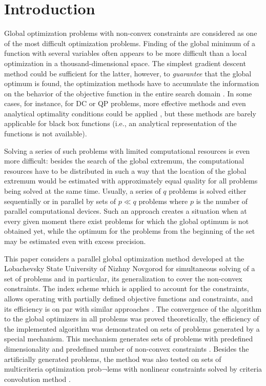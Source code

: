 \documentclass[runningheads]{llncs}
\begin{document}
\section{Introduction}
\label{sec-intro}
Global optimization problems with non-convex constraints are considered as one of the most difficult
optimization problems.
Finding of the global minimum of a function with several variables often appears to be
more difficult than a local optimization in a thousand-dimensional space.
The simplest gradient descent method could be sufficient for the latter, however,
to \textit{guarantee} that the global optimum is found, the optimization
methods have to accumulate the information on the behavior of the objective function
in the entire search domain  \cite{Jones2009,Paulavicius2011,Evtushenko2013,Strongin2000}.
In some cases, for instance, for DC or QP problems, more effective methods and even
analytical optimality conditions could be applied  \cite{PhamDinh2014, qpBook},
but these methods are barely applicable for black box functions (i.e., an analytical
representation of the functions is not available).

Solving a series of such problems with limited computational resources is even more
difficult: besides the search of the global extremum, the computational resources
have to be distributed in such a way that the location of the global extremum would be
estimated with approximately equal quality for all problems being solved at the same time.
Usually, a series of  \(q\) problems is solved either sequentially or in parallel by sets of  \(p\ll
q\) problems where \(p\) is the number of parallel computational devices.
Such an approach creates a situation when at every given moment there exist problems for which
the global optimum is not obtained yet, while the optimum for the problems from the beginning of
the set may be estimated even with excess precision.

This paper considers a parallel global optimization method developed at the Lobachevsky
State University of Nizhny Novgorod for simultaneous solving of a set of problems \cite{BarkalovStrongin2018}
and in particular, its generalization to cover the non-convex constraints. The index scheme \cite{Strongin2000,Pugliese}
which is applied to account for the constraints, allows operating with partially defined objective functions and constraints, and its efficiency is on par with similar approaches \cite{BarkalovLebedev2017}.
The convergence of the algorithm to the global optimizers in all problems was proved theoretically,
the efficiency of the implemented algorithm was demonstrated on sets of problems generated
by a special mechanism. This mechanism generates sets of problems with predefined dimensionality
and predefined number of non-convex constraints  \cite{GergelBarkalov2019}.
Besides the artificially generated problems, the method was also tested on sets of
multicriteria optimization prob¬lems with nonlinear constraints solved by
criteria convolution method  \cite{Ehrgott2005}.
\end{document}
